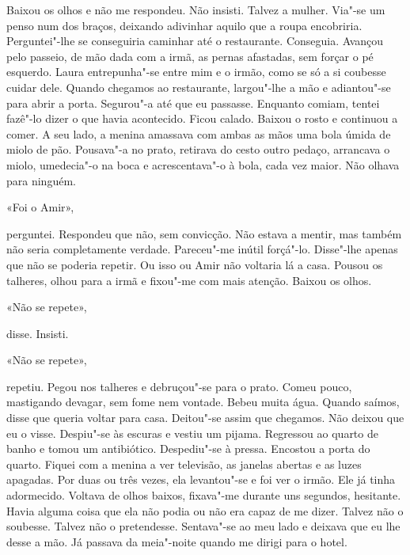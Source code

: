 Baixou os olhos e não me respondeu. Não insisti. Talvez a mulher.
Via"-se um penso num dos braços, deixando adivinhar aquilo que a roupa
encobriria. Perguntei"-lhe se conseguiria caminhar até o restaurante.
Conseguia. Avançou pelo passeio, de mão dada com a irmã, as pernas
afastadas, sem forçar o pé esquerdo. Laura entrepunha"-se entre mim e o
irmão, como se só a si coubesse cuidar dele. Quando chegamos ao
restaurante, largou"-lhe a mão e adiantou"-se para abrir a porta.
Segurou"-a até que eu passasse. Enquanto comiam, tentei fazê"-lo dizer o
que havia acontecido. Ficou calado. Baixou o rosto e continuou a comer.
A seu lado, a menina amassava com ambas as mãos uma bola úmida de miolo
de pão. Pousava"-a no prato, retirava do cesto outro pedaço, arrancava o
miolo, umedecia"-o na boca e acrescentava"-o à bola, cada vez maior.
Não olhava para ninguém.

«Foi o Amir»,

perguntei. Respondeu que não, sem convicção. Não estava a mentir, mas
também não seria completamente verdade. Pareceu"-me inútil forçá"-lo.
Disse"-lhe apenas que não se poderia repetir. Ou isso ou Amir não
voltaria lá a casa. Pousou os talheres, olhou para a irmã e fixou"-me
com mais atenção. Baixou os olhos.

«Não se repete»,

disse. Insisti.

«Não se repete»,

repetiu. Pegou nos talheres e debruçou"-se para o prato. Comeu pouco,
mastigando devagar, sem fome nem vontade. Bebeu muita água. Quando
saímos, disse que queria voltar para casa. Deitou"-se assim que
chegamos. Não deixou que eu o visse. Despiu"-se às escuras e vestiu um
pijama. Regressou ao quarto de banho e tomou um antibiótico.
Despediu"-se à pressa. Encostou a porta do quarto. Fiquei com a menina a
ver televisão, as janelas abertas e as luzes apagadas. Por duas ou três
vezes, ela levantou"-se e foi ver o irmão. Ele já tinha adormecido.
Voltava de olhos baixos, fixava"-me durante uns segundos, hesitante.
Havia alguma coisa que ela não podia ou não era capaz de me dizer.
Talvez não o soubesse. Talvez não o pretendesse. Sentava"-se ao meu lado
e deixava que eu lhe desse a mão. Já passava da meia"-noite quando me
dirigi para o hotel.

